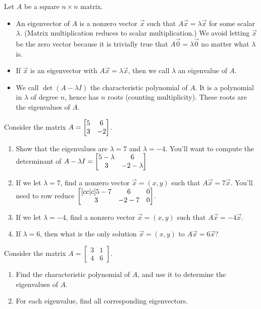 \begin{definition}
Let $A$ be a square $n\times n$ matrix. 
\begin{itemize}
 \item An eigenvector of $A$ is a nonzero vector $\vec x$ such that $A\vec x =\lambda \vec x$ for some scalar {$\lambda$}. (Matrix multiplication reduces to scalar multiplication.) We avoid letting $\vec x$ be the zero vector because it is trivially true that $A\vec 0=\lambda \vec 0$ no matter what $\lambda$ is.
 \item If $\vec x$ is an eigenvector with $A\vec x = \lambda \vec x$, then we call $\lambda$ an eigenvalue of $A$.
 \item We call $\det(A-\lambda I)$ the characteristic polynomial of $A$.  It is a polynomial in $\lambda$ of degree $n$, hence has $n$ roots (counting multiplicity).  These roots are the eigenvalues of $A$.
\end{itemize}
\end{definition}




\begin{problem}
 Consider the matrix $A=\begin{bmatrix} 5&6\\3&-2 \end{bmatrix}$. 
\begin{enumerate}
 \item Show that the eigenvalues are $\lambda = 7$ and $\lambda = -4$. You'll want to compute the determinant of $A-\lambda I = \begin{bmatrix} 5-\lambda&6\\3&-2-\lambda \end{bmatrix}$
 \item If we let $\lambda = 7$, find a nonzero vector $\vec x = (x,y)$ such that $A\vec x = 7\vec x$. You'll need to row reduce $\begin{bmatrix} [cc|c]5-7&6&0\\3&-2-7&0 \end{bmatrix}$.  
 \item If we let $\lambda = -4$, find a nonzero vector $\vec x = (x,y)$ such that $A\vec x = -4\vec x$.  
 \item If $\lambda = 6$, then what is the only solution $\vec x = (x,y)$ to $A\vec x = 6\vec x$? %
\end{enumerate}

\end{problem}


\begin{problem}
Consider the matrix 
$A=
\begin{bmatrix}
 3 & 1 \\
 4 & 6
\end{bmatrix}
$.
 \begin{enumerate}
 \item Find the characteristic polynomial of $A$, and use it to determine the eigenvalues of $A$. 
 \item For each eigenvalue, find all corresponding eigenvectors. 
\end{enumerate}
\end{problem}





